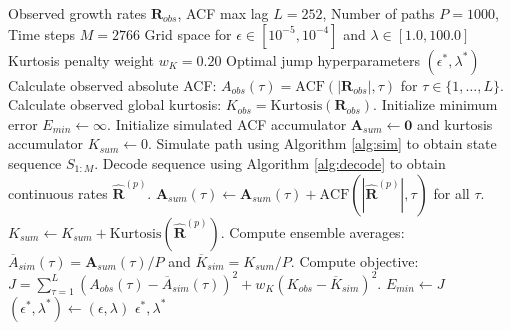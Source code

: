 \clearpage

\begin{algorithm}[htpb]
\caption{Multi-objective grid search for jump hyperparameters}
\label{alg:grid_search}
\begin{algorithmic}[1]
\REQUIRE Observed growth rates $\mathbf{R}_{obs}$, ACF max lag $L=252$, Number of paths $P=1000$, Time steps $M=2766$
\REQUIRE Grid space for $\epsilon \in [10^{-5}, 10^{-4}]$ and $\lambda \in [1.0, 100.0]$
\REQUIRE Kurtosis penalty weight $w_K = 0.20$
\ENSURE Optimal jump hyperparameters $(\epsilon^*, \lambda^*)$
\STATE Calculate observed absolute ACF: $A_{obs}(\tau) = \text{ACF}(|\mathbf{R}_{obs}|, \tau)$ for $\tau \in \{1, \dots, L\}$.
\STATE Calculate observed global kurtosis: $K_{obs} = \text{Kurtosis}(\mathbf{R}_{obs})$.
\STATE Initialize minimum error $E_{min} \leftarrow \infty$.
        \STATE Initialize simulated ACF accumulator $\mathbf{A}_{sum} \leftarrow \mathbf{0}$ and kurtosis accumulator $K_{sum} \leftarrow 0$.
            \STATE Simulate path using Algorithm \ref{alg:sim} to obtain state sequence $S_{1:M}$.
            \STATE Decode sequence using Algorithm \ref{alg:decode} to obtain continuous rates $\mathbf{\hat{R}}^{(p)}$.
            \STATE $\mathbf{A}_{sum}(\tau) \leftarrow \mathbf{A}_{sum}(\tau) + \text{ACF}(|\mathbf{\hat{R}}^{(p)}|, \tau)$ for all $\tau$.
            \STATE $K_{sum} \leftarrow K_{sum} + \text{Kurtosis}(\mathbf{\hat{R}}^{(p)})$.
        \ENDFOR
        \STATE Compute ensemble averages: $\overline{A}_{sim}(\tau) = \mathbf{A}_{sum}(\tau) / P$ and $\overline{K}_{sim} = K_{sum} / P$.
        \STATE Compute objective: $J = \sum_{\tau=1}^L \left(A_{obs}(\tau) - \overline{A}_{sim}(\tau)\right)^2 + w_K \left(K_{obs} - \overline{K}_{sim}\right)^2$.
            \STATE $E_{min} \leftarrow J$
            \STATE $(\epsilon^*, \lambda^*) \leftarrow (\epsilon, \lambda)$
        \ENDIF
    \ENDFOR
\ENDFOR
\RETURN $\epsilon^*, \lambda^*$
\end{algorithmic}
\end{algorithm}
